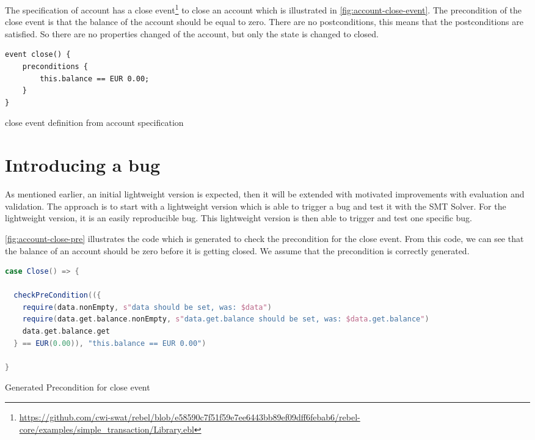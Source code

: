 The specification of account has a close event\footnote{\url{https://github.com/cwi-swat/rebel/blob/e58590c7f51f59e7ee6443bb89ef09dff6febab6/rebel-core/examples/simple_transaction/Library.ebl}}
to close an account which is illustrated in \autoref{fig:account-close-event}.
The precondition of the close event is that the balance of the account should be
equal to zero. There are no postconditions, this means that the postconditions
are satisfied. So there are no properties changed of the account, but only the state
is changed to closed.

\begin{sourcecode}[h!]
\begin{lstlisting}[]
event close() {
	preconditions {
		this.balance == EUR 0.00;
	}
}
\end{lstlisting}
\caption{close event definition from account specification}\label{fig:account-close-event}
\end{sourcecode}
\FloatBarrier

\section{Introducing a bug}

As mentioned earlier, an initial lightweight version is expected, then it will be extended with motivated improvements with evaluation and validation. The approach is to start with a lightweight version which is able to trigger a bug and test it with the SMT Solver. For the lightweight version, it is an easily reproducible bug. This lightweight version is then able to trigger and test one specific bug.

\autoref{fig:account-close-pre} illustrates the code which is generated to check the precondition for the close event. From this code, we can see that the balance of an account should be zero before it is getting closed. We assume that the precondition is correctly generated.

\begin{sourcecode}[h!]
\begin{lstlisting}[language=scala]
case Close() => {

  checkPreCondition(({
    require(data.nonEmpty, s"data should be set, was: $data")
    require(data.get.balance.nonEmpty, s"data.get.balance should be set, was: $data.get.balance")
    data.get.balance.get
  } == EUR(0.00)), "this.balance == EUR 0.00")

}
\end{lstlisting}
\caption{Generated Precondition for close event}\label{fig:account-close-pre}
\end{sourcecode}
\FloatBarrier

